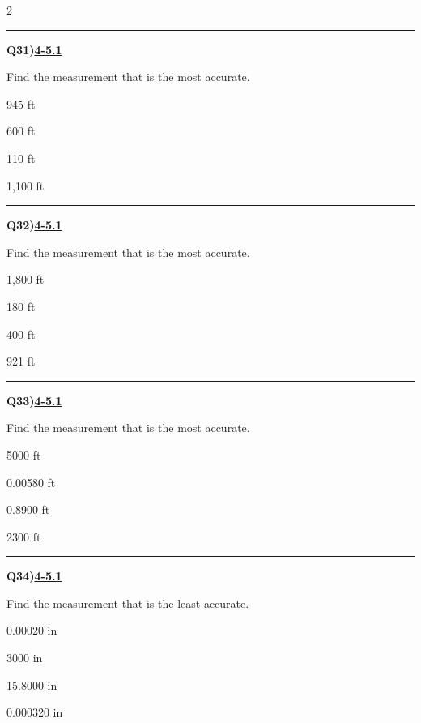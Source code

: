 \documentclass[11pt]{article}
\newenvironment{Qbox}[2]{%
  \par\medskip\noindent\begin{minipage}{\linewidth}%
  \hrule\medskip%
  \textbf{Q#1)}\hfill\textbf{\underline{#2}}\par\smallskip%
}{\par\end{minipage}\par\medskip}
\begin{document}
\begin{multicols}{2}
\begin{Qbox}{31}{4-5.1}
Find the measurement that is the most accurate.
\begin{choices}
  \item 945 ft
  \item 600 ft
  \item 110 ft
  \item 1,100 ft
\end{choices}
\end{Qbox}

\begin{Qbox}{32}{4-5.1}
Find the measurement that is the most accurate.
\begin{choices}
  \item 1,800 ft
  \item 180 ft
  \item 400 ft
  \item 921 ft
\end{choices}
\end{Qbox}

\begin{Qbox}{33}{4-5.1}
Find the measurement that is the most accurate.
\begin{choices}
  \item 5000 ft
  \item 0.00580 ft
  \item 0.8900 ft
  \item 2300 ft
\end{choices}
\end{Qbox}

\begin{Qbox}{34}{4-5.1}
Find the measurement that is the least accurate.
\begin{choices}
  \item 0.00020 in
  \item 3000 in
  \item 15.8000 in
  \item 0.000320 in
\end{choices}
\end{Qbox}


\end{multicols}
\end{document}
